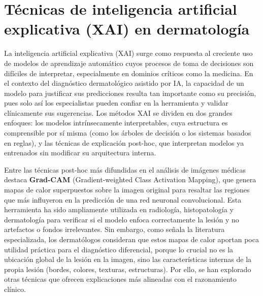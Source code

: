 \section{Técnicas de inteligencia artificial explicativa (XAI) en dermatología}

La inteligencia artificial explicativa (XAI) surge como respuesta al creciente uso de 
modelos de aprendizaje automático cuyos procesos de toma de decisiones son difíciles de 
interpretar, especialmente en dominios críticos como la medicina. En el contexto del 
diagnóstico dermatológico asistido por IA, la capacidad de un modelo para justificar sus 
predicciones resulta tan importante como su precisión, pues solo así los especialistas 
pueden confiar en la herramienta y validar clínicamente sus sugerencias. Los métodos XAI 
se dividen en dos grandes enfoques: los modelos intrínsecamente interpretables, cuya 
estructura es comprensible por sí misma (como los árboles de decisión o los sistemas basados en reglas), 
y las técnicas de explicación post-hoc, que interpretan modelos ya entrenados sin 
modificar su arquitectura interna.

Entre las técnicas post-hoc más difundidas en el análisis de imágenes médicas destaca 
\textbf{Grad-CAM} (Gradient-weighted Class Activation Mapping), que genera mapas de calor 
superpuestos sobre la imagen original para resaltar las regiones que más influyeron en la 
predicción de una red neuronal convolucional. Esta herramienta ha sido ampliamente 
utilizada en radiología, histopatología y dermatología para verificar si el modelo enfoca 
correctamente la lesión y no artefactos o fondos irrelevantes. Sin embargo, como señala la 
literatura especializada, los dermatólogos consideran que estos mapas de calor aportan 
poca utilidad práctica para el diagnóstico diferencial, porque lo crucial no es la 
ubicación global de la lesión en la imagen, sino las características internas de la propia 
lesión (bordes, colores, texturas, estructuras). Por ello, se han explorado otras técnicas 
que ofrecen explicaciones más alineadas con el razonamiento clínico.

